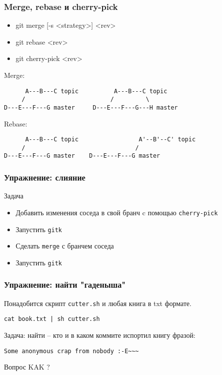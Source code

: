 \begin{frame}[fragile]
	\frametitle{Merge, rebase и cherry-pick}

	\begin{itemize}
		\item git merge [-s <strategy>] <rev>
		\item git rebase <rev> 
		\item git cherry-pick <rev> 
	\end{itemize}

	Merge:

	\begin{verbatim}
      A---B---C topic          A---B---C topic
     /                        /         \
D---E---F---G master     D---E---F---G---H master
	\end{verbatim}

	Rebase:

	\begin{verbatim}
      A---B---C topic                 A'--B'--C' topic
     /                               /         
D---E---F---G master    D---E---F---G master
	\end{verbatim}

\end{frame}


\begin{frame}[fragile]
	\frametitle{Упражнение: слияние}

		   
	\begin{block}{Задача}
		\begin{itemize}
			\item Добавить изменения соседа в свой бранч c помощью {\tt cherry-pick} 
			\item Запустить {\tt gitk}
			\item Сделать {\tt merge} с бранчем соседа
			\item Запустить {\tt gitk}
		\end{itemize}
	\end{block}
\end{frame}


\begin{frame}[fragile]
	\frametitle{Упражнение: найти "гаденыша"}

	Понадобится скрипт {\tt cutter.sh} и любая книга в txt формате.

	\begin{verbatim}
cat book.txt | sh cutter.sh
	\end{verbatim}

	Задача: найти -- кто и в каком коммите испортил книгу фразой:
	\begin{verbatim}
Some anonymous crap from nobody :-E~~~
	\end{verbatim}
	
	\begin{block}{Вопрос}
		\Large{KAK ?}
	\end{block}
\end{frame}

